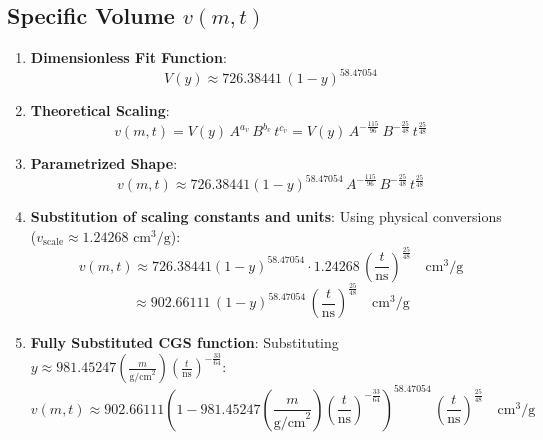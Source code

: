 \documentclass[11pt]{article}
\begin{document}
\subsection{Specific Volume $v(m,t)$}
\begin{enumerate}
    \item \textbf{Dimensionless Fit Function}:
    $$V(y) \approx 726.38441 \, (1 - y)^{58.47054}$$
    \item \textbf{Theoretical Scaling}:
    $$v(m,t) = V(y) \, A^{a_v} \, B^{b_v} \, t^{c_v} = V(y) \, A^{-\frac{115}{96}} \, B^{-\frac{25}{48}} \, t^{\frac{25}{48}}$$
    \item \textbf{Parametrized Shape}:
    $$v(m,t) \approx 726.38441 (1 - y)^{58.47054} \, A^{-\frac{115}{96}} \, B^{-\frac{25}{48}} \, t^{\frac{25}{48}}$$
    \item \textbf{Substitution of scaling constants and units}:
    Using physical conversions ($v_{\text{scale}} \approx 1.24268 \text{ cm}^3/\text{g}$):
    $$v(m,t) \approx 726.38441 (1 - y)^{58.47054} \cdot 1.24268 \, \left(\frac{t}{\text{ns}}\right)^{\frac{25}{48}} \quad \text{cm}^3/\text{g}$$
    $$\approx 902.66111 \, (1 - y)^{58.47054} \, \left(\frac{t}{\text{ns}}\right)^{\frac{25}{48}} \quad \text{cm}^3/\text{g}$$
    \item \textbf{Fully Substituted CGS function}:
    Substituting $y \approx 981.45247 \left(\frac{m}{\text{g/cm}^2}\right) \left(\frac{t}{\text{ns}}\right)^{-\frac{33}{64}}$:
    $$v(m,t) \approx 902.66111 \left(1 - 981.45247 \left(\frac{m}{\text{g/cm}^2}\right) \left(\frac{t}{\text{ns}}\right)^{-\frac{33}{64}}\right)^{58.47054} \, \left(\frac{t}{\text{ns}}\right)^{\frac{25}{48}} \quad \text{cm}^3/\text{g}$$
\end{enumerate}
\end{document}
